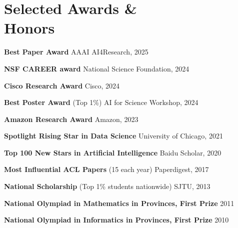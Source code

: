 \vspace{-1mm}
\section{Selected Awards \& \\Honors}


\noindent \textbf{Best Paper Award} \hfill AAAI AI4Research, 2025 

\vspace{-2mm}
\noindent \textbf{NSF CAREER award} \hfill National Science Foundation, 2024 


\vspace{-2mm}
\noindent \textbf{Cisco Research Award} \hfill Cisco, 2024


\vspace{-2mm}
\noindent \textbf{Best Poster Award} {\small (Top 1\%)} \hfill AI for Science Workshop, 2024



\vspace{-2mm}
\noindent \textbf{Amazon Research Award} \hfill Amazon, 2023 

\vspace{-2mm}
\noindent \textbf{Spotlight Rising Star in Data Science} \hfill University of Chicago, 2021 

\vspace{-2mm}
\noindent \textbf{Top 100 New Stars in Artificial Intelligence} \hfill Baidu Scholar, 2020 


\vspace{-2mm}
\noindent \textbf{Most Influential ACL Papers} {\small (15 each year)} \hfill Paperdigest, 2017 

\vspace{-2mm}
\noindent \textbf{National Scholarship} {\small (Top 1\% students nationwide)} \hfill SJTU, 2013 

\vspace{-2mm}
\noindent \textbf{National Olympiad in Mathematics in Provinces, First Prize} \hfill 2011 


\vspace{-2mm}
\noindent \textbf{National Olympiad in Informatics in Provinces, First Prize} \hfill 2010 \\
